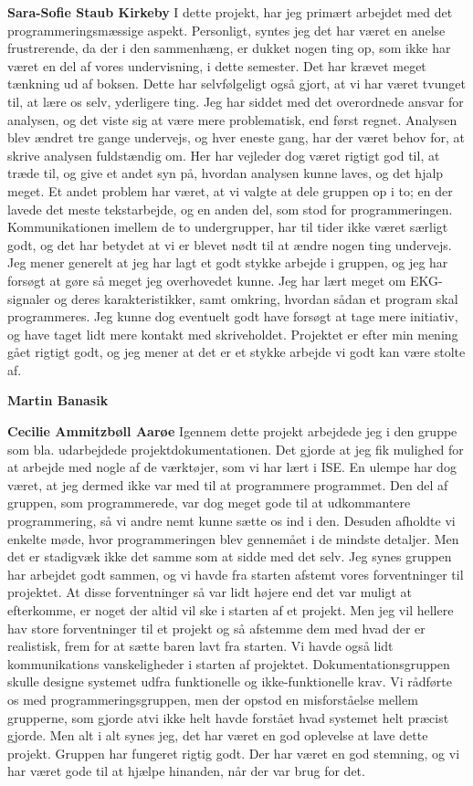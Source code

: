 \textbf{Sara-Sofie Staub Kirkeby}
I dette projekt, har jeg primært arbejdet med det programmeringsmæssige aspekt. Personligt, syntes jeg det har været en anelse frustrerende, da der i den sammenhæng, er dukket nogen ting op, som ikke har været en del af vores undervisning, i dette semester. Det har krævet meget tænkning ud af boksen. Dette har selvfølgeligt også gjort, at vi har været tvunget til, at lære os selv, yderligere ting. 
Jeg har siddet med det overordnede ansvar for analysen, og det viste sig at være mere problematisk, end først regnet. Analysen blev ændret tre gange undervejs, og hver eneste gang, har der været behov for, at skrive analysen fuldstændig om. Her har vejleder dog været rigtigt god til, at træde til, og give et andet syn på, hvordan analysen kunne laves, og det hjalp meget. 
Et andet problem har været, at vi valgte at dele gruppen op i to; en der lavede det meste tekstarbejde, og en anden del, som stod for programmeringen. Kommunikationen imellem de to undergrupper, har til tider ikke været særligt godt, og det har betydet at vi er blevet nødt til at ændre nogen ting undervejs. 
Jeg mener generelt at jeg har lagt et godt stykke arbejde i gruppen, og jeg har forsøgt at gøre så meget jeg overhovedet kunne. Jeg har lært meget om EKG-signaler og deres karakteristikker, samt omkring, hvordan sådan et program skal programmeres. Jeg kunne dog eventuelt godt have forsøgt at tage mere initiativ, og have taget lidt mere kontakt med skriveholdet. 
Projektet er efter min mening gået rigtigt godt, og jeg mener at det er et stykke arbejde vi godt kan være stolte af.

\textbf{Martin Banasik}

\textbf{Cecilie Ammitzbøll Aarøe}
Igennem dette projekt arbejdede jeg i den gruppe som bla. udarbejdede projektdokumentationen. Det gjorde at jeg fik mulighed for at arbejde med nogle af de værktøjer, som vi har lært i ISE. En ulempe har dog været, at jeg dermed ikke var med til at programmere programmet. Den del af gruppen, som programmerede, var dog meget gode til at udkommantere programmering, så vi andre nemt kunne sætte os ind i den. Desuden afholdte vi enkelte møde, hvor programmeringen blev gennemået i de mindste detaljer. Men det er stadigvæk ikke det samme som at sidde med det selv.
Jeg synes gruppen har arbejdet godt sammen, og vi havde fra starten afstemt vores forventninger til projektet. At disse forventninger så var lidt højere end det var muligt at efterkomme, er noget der altid vil ske i starten af et projekt. Men jeg vil hellere hav store forventninger til et projekt og så afstemme dem med hvad der er realistisk, frem for at sætte baren lavt fra starten.
Vi havde også lidt kommunikations vanskeligheder i starten af projektet. Dokumentationsgruppen skulle designe systemet udfra funktionelle og ikke-funktionelle krav. Vi rådførte os med programmeringsgruppen, men der opstod en misforståelse mellem grupperne, som gjorde atvi ikke helt havde forstået hvad systemet helt præcist gjorde.
Men alt i alt synes jeg, det har været en god oplevelse at lave dette projekt. Gruppen har fungeret rigtig godt. Der har været en god stemning, og vi har været gode til at hjælpe hinanden, når der var brug for det.

